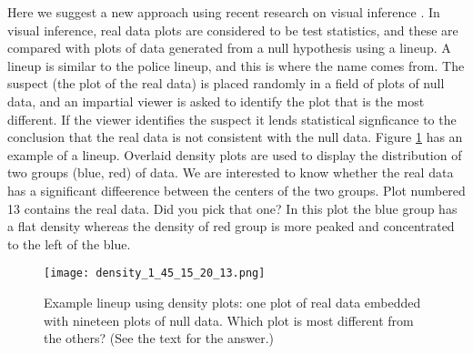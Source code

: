 

Here we suggest a new approach using recent research on visual
inference \citep{buja:2009,wickham:2010}. In visual inference, real
data plots are considered to be test statistics, and these are
compared with plots of data generated from a null hypothesis using a
lineup. A lineup is similar to the police lineup, and this is where
the name comes from. The suspect (the plot of the real data) is placed
randomly in a field of plots of null data, and an impartial viewer is
asked to identify the plot that is the most different. If the viewer
identifies the suspect it lends statistical signficance to the
conclusion that the real data is not consistent with the null
data. Figure \ref{lineup} has an example of a lineup. Overlaid density
plots are used to display the distribution of two groups (blue, red)
of data. We are interested to know whether the real data has a
significant diffeerence between the centers of the two groups. Plot
numbered 13 contains the real data. Did you pick that one? In this
plot the blue group has a flat density whereas the density of red
group is more peaked and concentrated to the left of the blue.

\begin{figure}[htbp]
   \centering
   \texttt{[image: density\_1\_45\_15\_20\_13.png]} 
   \caption{Example lineup using density plots: one plot of real data
     embedded with nineteen plots of null data. Which plot is
     most different from the others? (See the text for the answer.)}
   \label{lineup}
\end{figure}


